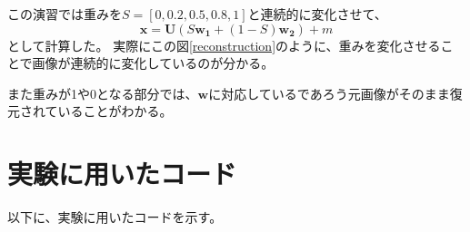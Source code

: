 \documentclass[a4paper,11pt,dvipdfmx]{jsarticle}
\begin{document}
この演習では重みを$S=[0, 0.2, 0.5, 0.8, 1]$と連続的に変化させて、
\begin{equation}
    \mathbf{x} = \mathbf{U} (S\mathbf{w_1} + (1-S)\mathbf{w_2}) + m
\end{equation}
として計算した。
実際にこの図\ref{reconstruction}のように、重みを変化させることで画像が連続的に変化しているのが分かる。

また重みが1や0となる部分では、$\mathbf{w}$に対応しているであろう元画像がそのまま復元されていることがわかる。

\section{実験に用いたコード}
以下に、実験に用いたコードを示す。




\end{document}
